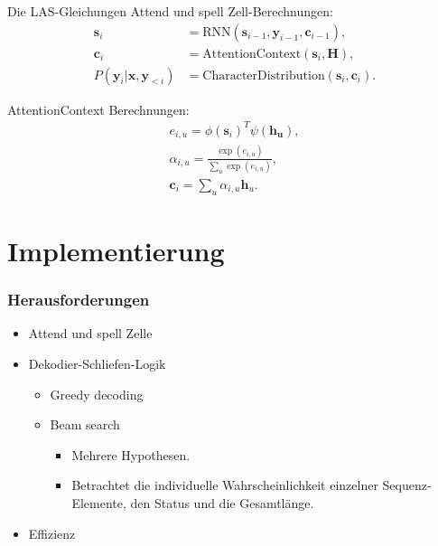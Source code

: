 \documentclass[10pt]{beamer}
\begin{document}
\begin{frame}{Die LAS-Gleichungen}
Attend und spell Zell-Berechnungen:
\begin{align}
	 \mathbf{s}_i &= \text{RNN}(\mathbf{s}_{i-1}, \mathbf{y}_{i-1}, \mathbf{c}_{i-1}), \\
	 \mathbf{c}_i &= \text{AttentionContext}(\mathbf{s}_i,\mathbf{H}), \\
	  P(\mathbf{y}_i|\mathbf{x}, \mathbf{y}_{<i}) &= \text{CharacterDistribution}(\mathbf{s}_i,\textbf{c}_i).
\end{align}

AttentionContext Berechnungen:
\begin{align}
	e_{i,u} = \phi(\mathbf{s}_i)^T \psi(\mathbf{h_u}), \\
	\alpha_{i,u} = \frac{ \exp(e_{i,u})}{ \sum\limits_{u} \exp(e_{i,u})}, \\
	\label{eq:alphas}
	\mathbf{c}_i = \sum\limits_{u} \alpha_{i,u} \mathbf{h}_u.
\end{align}
\end{frame}

\section{Implementierung}


\begin{frame}[fragile]
\frametitle{Herausforderungen}
\begin{itemize}

\item Attend und spell Zelle
\item Dekodier-Schliefen-Logik
	\begin{itemize}
	\item Greedy decoding
	\item Beam search
		\begin{itemize}
		\item Mehrere Hypothesen.
		\item Betrachtet die individuelle Wahrscheinlichkeit einzelner
			  Sequenz-Elemente, den Status und die Gesamtlänge.
		\end{itemize}
	\end{itemize}
\item Effizienz
\end{itemize}
\end{frame}
\end{document}
